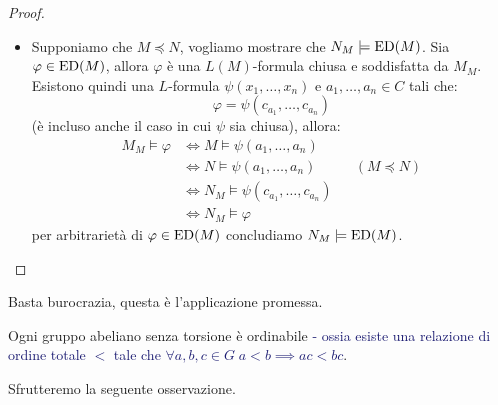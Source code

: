 \begin{proof}
\begin{itemize}
\begin{itemize}
\begin{align*}
                                                             &\iff \neg\, \varphi(c_{a_1}, \ldots, c_{a_k}) \in \ED(M) \\
                                                             &\implies N_M \models \neg\, \varphi(c_{a_1}, \ldots, c_{a_k}) \\
                                                             &\iff N_M \not \models \varphi(c_{a_1}, \ldots, c_{a_k}) \\
                                                             &\iff N \not \models \varphi(a_1, \ldots, a_k)
                \end{align*}
                (essendo formule chiuse $\not\models$ è equivalente a $\models \neg\,$).
                \item[$\boxed{\implies}$] Supponiamo che $M \preceq N$, vogliamo mostrare che $N_M \models \operatorname{ED}(M)$. Sia $\varphi \in \operatorname{ED}(M)$, allora $\varphi$ è una $L(M)$-formula chiusa e soddisfatta da $M_M$.
                Esistono quindi una $L$-formula $\psi(x_1,\ldots,x_n)$ e $a_1,\ldots,a_n \in C$ tali che:
                \[ \varphi = \psi(c_{a_1},\ldots,c_{a_n}) \]
                (è incluso anche il caso in cui $\psi$ sia chiusa), allora:
                \begin{align*}
                    M_M \models \varphi &\iff M \models \psi(a_1,\ldots,a_n) \\
                                        &\iff N \models \psi(a_1,\ldots,a_n) &&(M \preceq N) \\
                                        &\iff N_M \models \psi(c_{a_1},\ldots,c_{a_n}) \\
                                        &\iff N_M \models \varphi
                \end{align*}
                per arbitrarietà di $\varphi \in \operatorname{ED}(M)$ concludiamo $N_M \models \operatorname{ED}(M)$.
            \end{itemize}
    \end{itemize}
\end{proof}
\fi
Basta burocrazia, questa è l'applicazione promessa.

\begin{theorem}[Levi]
    Ogni gruppo abeliano senza torsione è ordinabile \textcolor{MidnightBlue}{- ossia esiste una relazione di ordine totale $<$ tale che $\forall a,b,c \in G \; a < b \implies ac < bc$}.
\end{theorem}

Sfrutteremo la seguente osservazione.

